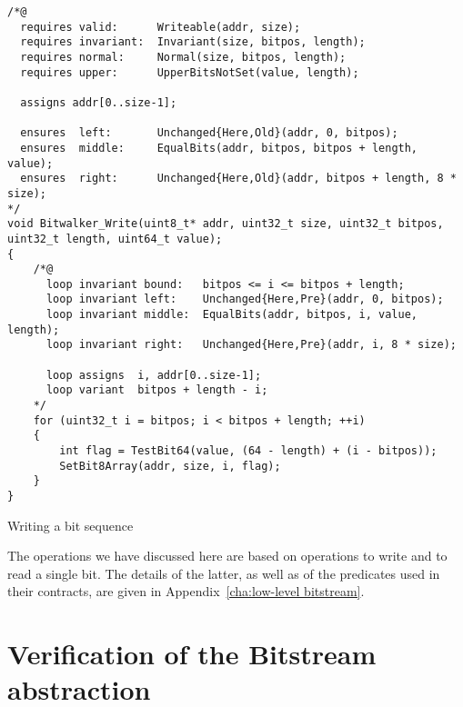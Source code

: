 \begin{listing}[hbt]
\begin{minipage}{0.99\textwidth}
\begin{lstlisting}[style=acsl-block]
/*@
  requires valid:      Writeable(addr, size);
  requires invariant:  Invariant(size, bitpos, length);
  requires normal:     Normal(size, bitpos, length);
  requires upper:      UpperBitsNotSet(value, length);

  assigns addr[0..size-1];

  ensures  left:       Unchanged{Here,Old}(addr, 0, bitpos);
  ensures  middle:     EqualBits(addr, bitpos, bitpos + length, value);
  ensures  right:      Unchanged{Here,Old}(addr, bitpos + length, 8 * size);
*/
void Bitwalker_Write(uint8_t* addr, uint32_t size, uint32_t bitpos, uint32_t length, uint64_t value);
{
    /*@
      loop invariant bound:   bitpos <= i <= bitpos + length;
      loop invariant left:    Unchanged{Here,Pre}(addr, 0, bitpos);
      loop invariant middle:  EqualBits(addr, bitpos, i, value, length);
      loop invariant right:   Unchanged{Here,Pre}(addr, i, 8 * size);

      loop assigns  i, addr[0..size-1];
      loop variant  bitpos + length - i;
    */
    for (uint32_t i = bitpos; i < bitpos + length; ++i)
    {
        int flag = TestBit64(value, (64 - length) + (i - bitpos));
        SetBit8Array(addr, size, i, flag);
    }   
}

\end{lstlisting}
\end{minipage}
\caption{\label{Bitwalker_Write spec}Writing a bit sequence}
\end{listing}

The operations we have discussed here are based
on operations to write and to read a single bit.
%
The details of the latter, as well as of the predicates used in their
contracts, are given in Appendix~\ref{cha:low-level bitstream}.















\section{Verification of the Bitstream abstraction}
\label{sec:bitstream verif}



